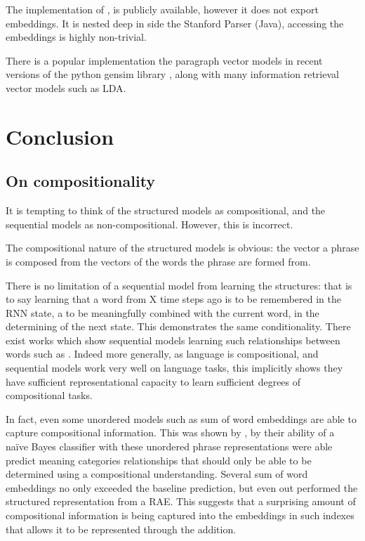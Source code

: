 \documentclass[12pt,parskip]{komatufte}
\begin{document}
The implementation of , is publicly available,
however it does not export embeddings.
It is nested deep in side the Stanford Parser (Java), accessing the embeddings is highly non-trivial.

There is a popular implementation the paragraph vector models in recent versions of the python gensim library , along with many information retrieval vector models such as LDA.

\section{Conclusion}

\subsection{On compositionality}
 

It is tempting to think of the structured models as compositional,
and the sequential models as non-compositional.
However, this is incorrect.

The compositional nature of the structured models is obvious:
the vector a phrase is composed from the vectors of the words the phrase are formed from.

There is no limitation of a sequential model from learning the structures:
that is to say learning that a word from X time steps ago is to be remembered in the RNN state, a to be meaningfully combined with the current word, in the determining of the next state.
This demonstrates the same conditionality.
There exist works which show sequential models learning such relationships between words such as .
Indeed more generally, as language is compositional, and sequential models work very well on language tasks, this implicitly shows they have sufficient representational capacity to learn sufficient degrees of compositional tasks.

In fact, even some unordered models such as sum of word embeddings are able to capture compositional information.
This was shown by \textcite{RitterPosition}, by their ability of a na\"ive Bayes classifier with these unordered phrase representations were able predict meaning categories relationships that should only be able to be determined using a compositional understanding.
Several  sum of word embeddings no only exceeded the baseline prediction, but even out performed the structured representation from a RAE.
This suggests that a surprising amount of compositional information is being captured into the embeddings in such indexes that allows it to be represented through the addition.

 
\end{document}
